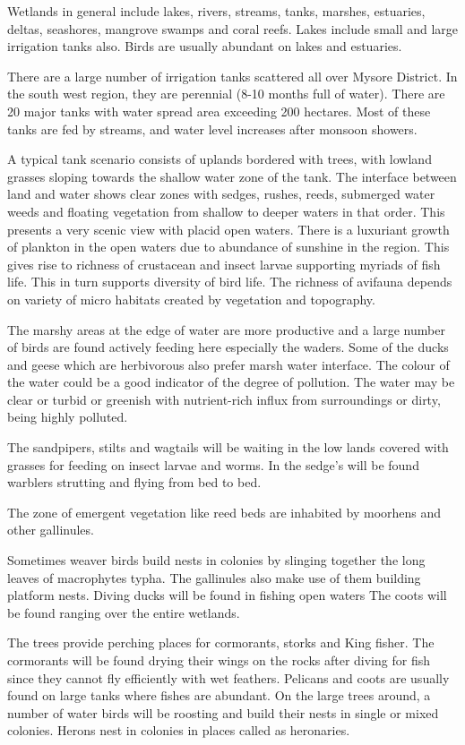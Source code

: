 Wetlands in general include lakes, rivers, streams, 
tanks, marshes, estuaries, deltas, seashores, mangrove swamps 
and coral reefs. Lakes include small and large irrigation 
tanks also. Birds are usually abundant on lakes and estuaries. 

There are a large number of irrigation tanks scattered 
all over Mysore District. In the south west region, they are 
perennial (8-10 months full of water). There are 20 major 
tanks with water spread area exceeding 200 hectares. Most 
of these tanks are fed by streams, and water level increases 
after monsoon showers. 

A typical tank scenario consists of uplands bordered 
with trees, with lowland grasses sloping towards the shallow 
water zone of the tank. The interface between land and water 
shows clear zones with sedges, rushes, reeds, submerged water 
weeds and floating vegetation from shallow to deeper waters 
in that order. This presents a very scenic view with placid 
open waters. There is a luxuriant growth of plankton in the 
open waters due to abundance of sunshine in the region. This 
gives rise to richness of crustacean and insect larvae 
supporting myriads of fish life. This in turn supports 
diversity of bird life. The richness of avifauna depends on 
variety of micro habitats created by vegetation and 
topography. 

The marshy areas at the edge of water are more
productive and a large number of birds are found actively 
feeding here especially the waders. Some of the ducks and geese 
which are herbivorous also prefer marsh water interface. The 
colour of the water could be a good indicator of the degree 
of pollution. The water may be clear or turbid or greenish 
with nutrient-rich influx from surroundings or dirty, being 
highly polluted. 

The sandpipers, stilts and wagtails will be waiting in 
the low lands covered with grasses for feeding on insect 
larvae and worms. In the sedge's will be found warblers 
strutting and flying from bed to bed. 

The zone of emergent vegetation like reed beds are 
inhabited by moorhens and other gallinules. 

Sometimes weaver birds build nests in colonies by 
slinging together the long leaves of macrophytes typha. The 
gallinules also make use of them building platform nests. 
Diving ducks will be found in fishing open waters The coots 
will be found ranging over the entire wetlands. 

The trees provide perching places for cormorants, storks 
and King fisher. The cormorants will be found drying their 
wings on the rocks after diving for fish since they cannot 
fly efficiently with wet feathers. Pelicans and coots are 
usually found on large tanks where fishes are abundant. On the 
large trees around, a number of water birds will be roosting 
and build their nests in single or mixed colonies. Herons 
nest in colonies in places called as heronaries. 

